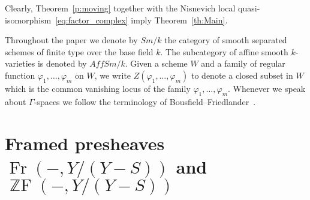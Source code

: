 \documentclass[a4paper,11pt,reqno]{amsart}
\begin{document}
Clearly, Theorem~\ref{p:moving} together with the Nisnevich local
quasi-isomorphism~\eqref{eq:factor_complex} imply
Theorem~\ref{th:Main}.

Throughout the paper we denote by $Sm/k$ the category of smooth
separated schemes of finite type over the base field $k$. The
subcategory of affine smooth $k$-varieties is denoted by $AffSm/k$.
Given a scheme $W$ and a family of regular function
${\varphi}_1,\ldots,{\varphi}_m$ on $W$, we write $Z({\varphi}_1,\ldots,{\varphi}_{m})$
to denote a closed subset in $W$ which is the common vanishing locus
of the family ${\varphi}_1,\ldots,{\varphi}_m$. Whenever we speak about $\Gamma$-spaces
we follow the terminology of Bousfield--Friedlander~\cite{BF}.

\section{Framed presheaves ${\operatorname{Fr}}(-,Y/(Y-S))$ and ${\operatorname{\mathbb{Z}F}}(-,Y/(Y-S))$}
\end{document}
